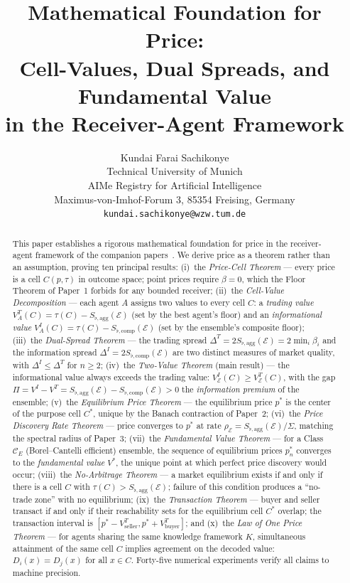 \documentclass[twocolumn,11pt,a4paper]{article}
\title{\textbf{Mathematical Foundation for Price:\\
Cell-Values, Dual Spreads, and Fundamental Value\\
in the Receiver-Agent Framework}}
\author{Kundai Farai Sachikonye\\[4pt]
\small Technical University of Munich\\
\small AIMe Registry for Artificial Intelligence\\
\small Maximus-von-Imhof-Forum 3, 85354 Freising, Germany\\
\small \texttt{kundai.sachikonye@wzw.tum.de}}
\date{}
\theoremstyle{remark}
\newcommand{\tol}{\tau}
\newcommand{\Ens}{\mathcal{E}}
\newcommand{\MidP}{p^*}                  %
\newcommand{\SpreadT}{\Delta^T}          %
\newcommand{\SpreadI}{\Delta^I}          %
\newcommand{\ValT}{V^T}                  %
\newcommand{\ValI}{V^I}                  %
\newcommand{\FV}{V^*}                    %
\newcommand{\SflatT}{S_{\flat,\mathrm{agg}}}        %
\newcommand{\SflatI}{S_{\flat,\mathrm{comp}}}       %
\newcommand{\Prem}{\Pi}                  %
\newcommand{\srad}{\rho}               %
\begin{document}
\maketitle

\begin{abstract}
\noindent
This paper establishes a rigorous mathematical foundation for price in the
receiver-agent framework of the companion
papers~\cite{sachikonye2025agents,sachikonye2025market,sachikonye2025het}.
We derive price as a theorem rather than an assumption, proving ten principal
results:
(i)~the \emph{Price-Cell Theorem} --- every price is a cell $C(p,\tol)$ in
outcome space; point prices require $\beta=0$, which the Floor Theorem of
Paper~1 forbids for any bounded receiver;
(ii)~the \emph{Cell-Value Decomposition} --- each agent $A$ assigns two
values to every cell $C$: a \emph{trading value}
$\ValT_A(C) = \tol(C) - \SflatT(\Ens)$ (set by the best agent's floor) and
an \emph{informational value}
$\ValI_A(C) = \tol(C) - \SflatI(\Ens)$ (set by the ensemble's composite
floor);
(iii)~the \emph{Dual-Spread Theorem} --- the trading spread $\SpreadT = 2
\SflatT(\Ens) = 2\min_i\beta_i$ and the information spread
$\SpreadI = 2\SflatI(\Ens)$ are two distinct measures of market quality,
with $\SpreadI \le \SpreadT$ for $n \ge 2$;
(iv)~the \emph{Two-Value Theorem} (main result) --- the informational value
always exceeds the trading value: $\ValI_\Ens(C) \ge \ValT_\Ens(C)$,
with the gap $\Prem = \ValI - \ValT = \SflatT(\Ens) - \SflatI(\Ens) > 0$
the \emph{information premium} of the ensemble;
(v)~the \emph{Equilibrium Price Theorem} --- the equilibrium price $\MidP$
is the center of the purpose cell $C^*$, unique by the Banach contraction
of Paper~2;
(vi)~the \emph{Price Discovery Rate Theorem} --- price converges to $\MidP$
at rate $\srad_\Ens = \SflatT(\Ens)/\Sigma$, matching the spectral radius
of Paper~3;
(vii)~the \emph{Fundamental Value Theorem} --- for a Class~$\mathcal{C}_E$
(Borel--Cantelli efficient) ensemble, the sequence of equilibrium prices
$\MidP_n$ converges to the \emph{fundamental value} $\FV$, the unique
point at which perfect price discovery would occur;
(viii)~the \emph{No-Arbitrage Theorem} --- a market equilibrium exists if
and only if there is a cell $C$ with $\tol(C) > \SflatT(\Ens)$; failure
of this condition produces a ``no-trade zone'' with no equilibrium;
(ix)~the \emph{Transaction Theorem} --- buyer and seller transact if and
only if their reachability sets for the equilibrium cell $C^*$ overlap;
the transaction interval is $[\MidP - \ValT_{\mathrm{seller}},
\MidP + \ValT_{\mathrm{buyer}}]$;
and
(x)~the \emph{Law of One Price Theorem} --- for agents sharing the same
knowledge framework $K$, simultaneous attainment of the same cell
$C$ implies agreement on the decoded value: $D_i(x) = D_j(x)$ for all
$x \in C$.
Forty-five numerical experiments verify all claims to machine precision.
\end{abstract}
\end{document}
